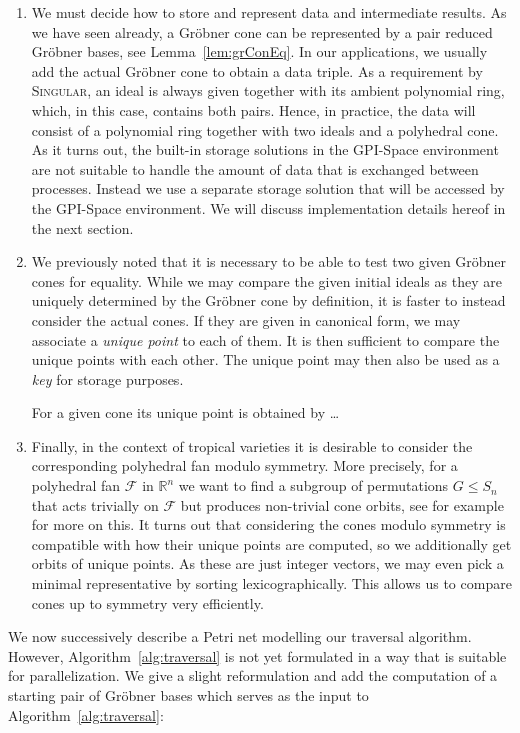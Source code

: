 \documentclass[
  paper=a4,
  titlepage,
  bibliography=totoc,
  pagesize=pdftex
]{scrartcl}
\numberwithin{figure}{section}
\numberwithin{equation}{section}
\numberwithin{table}{section}
\newcommand*\setR{\mathds{R}}
\theoremstyle{definition}
\numberwithin{definition}{section}
\begin{document}
\begin{enumerate}[label=\arabic*.]
  \item We must decide how to store and represent data and intermediate results. As we
    have seen already, a Gröbner cone can be represented by a pair reduced Gröbner bases,
    see Lemma~\ref{lem:grConEq}. In our applications, we usually add the actual Gröbner
    cone to obtain a data triple. As a requirement by \textsc{Singular}, an ideal is
    always given together with its ambient polynomial ring, which, in this case, contains
    both pairs. Hence, in practice, the data will consist of a polynomial ring together
    with two ideals and a polyhedral cone. As it turns out, the built-in storage solutions
    in the GPI-Space environment are not suitable to handle the amount of data that is
    exchanged between processes. Instead we use a separate storage solution that will be
    accessed by the GPI-Space environment. We will discuss implementation details hereof
    in the next section.
  \item We previously noted that it is necessary to be able to test two given Gröbner
    cones for equality. While we may compare the given initial ideals as they are uniquely
    determined by the Gröbner cone by definition, it is faster to instead consider the
    actual cones. If they are given in canonical form, we may associate a \emph{unique
    point} to each of them. It is then sufficient to compare the unique points with each
    other. The unique point may then also be used as a \emph{key} for storage purposes.

    For a given  cone its unique point is obtained by \dots
  \item Finally, in the context of tropical varieties it is desirable to consider the
    corresponding polyhedral fan modulo symmetry. More precisely, for a polyhedral fan
    $\mathcal F$ in $\setR^n$ we want to find a subgroup of permutations $G \leq S_n$ that
    acts trivially on $\mathcal F$ but produces non-trivial cone orbits, see for example
    \cite{JenTravSym} for more on this. It turns out that considering the cones modulo
    symmetry is compatible with how their unique points are computed, so we additionally
    get orbits of unique points. As these are just integer vectors, we may even pick a
    minimal representative by sorting lexicographically. This allows us to compare cones
    up to symmetry very efficiently.
\end{enumerate}
We now successively describe a Petri net modelling our traversal algorithm. However,
Algorithm~\ref{alg:traversal} is not yet formulated in a way that is suitable for
parallelization. We give a slight reformulation and add the computation of a starting pair
of Gröbner bases which serves as the input to Algorithm~\ref{alg:traversal}:
\end{document}
